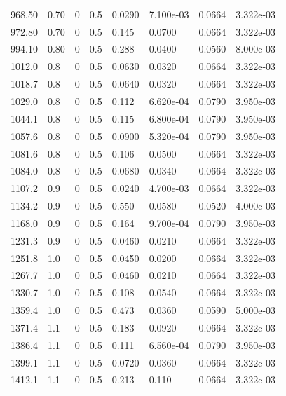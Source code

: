 \documentclass[preview]{standalone}
\begin{document}
{{{\begin{tabular}{L{1.2cm}C{1.2cm} C{0.3cm}C{0.5cm} C{1.4cm}C{1.4cm} C{1.4cm}C{1.4cm}}
  968.50  &  0.70  & 0     & 0.5 &  0.0290  & 7.100e-03  & 0.0664 &  3.322e-03   \\ 
  972.80  &  0.70  & 0     & 0.5 &  0.145  & 0.0700  & 0.0664 &  3.322e-03   \\ 
  994.10  &  0.80  & 0     & 0.5 &  0.288  & 0.0400  & 0.0560 &  8.000e-03   \\ 
  1012.0  &   0.8  & 0     & 0.5 &  0.0630  & 0.0320  & 0.0664 &  3.322e-03   \\ 
  1018.7  &   0.8  & 0     & 0.5 &  0.0640  & 0.0320  & 0.0664 &  3.322e-03   \\ 
  1029.0  &   0.8  & 0     & 0.5 &  0.112  & 6.620e-04  & 0.0790 &  3.950e-03   \\ 
  1044.1  &   0.8  & 0     & 0.5 &  0.115  & 6.800e-04  & 0.0790 &  3.950e-03   \\ 
  1057.6  &   0.8  & 0     & 0.5 &  0.0900  & 5.320e-04  & 0.0790 &  3.950e-03   \\ 
  1081.6  &   0.8  & 0     & 0.5 &  0.106  & 0.0500  & 0.0664 &  3.322e-03   \\ 
  1084.0  &   0.8  & 0     & 0.5 &  0.0680  & 0.0340  & 0.0664 &  3.322e-03   \\ 
  1107.2  &   0.9  & 0     & 0.5 &  0.0240  & 4.700e-03  & 0.0664 &  3.322e-03   \\ 
  1134.2  &   0.9  & 0     & 0.5 &  0.550  & 0.0580  & 0.0520 &  4.000e-03   \\ 
  1168.0  &   0.9  & 0     & 0.5 &  0.164  & 9.700e-04  & 0.0790 &  3.950e-03   \\ 
  1231.3  &   0.9  & 0     & 0.5 &  0.0460  & 0.0210  & 0.0664 &  3.322e-03   \\ 
  1251.8  &   1.0  & 0     & 0.5 &  0.0450  & 0.0200  & 0.0664 &  3.322e-03   \\ 
  1267.7  &   1.0  & 0     & 0.5 &  0.0460  & 0.0210  & 0.0664 &  3.322e-03   \\ 
  1330.7  &   1.0  & 0     & 0.5 &  0.108  & 0.0540  & 0.0664 &  3.322e-03   \\ 
  1359.4  &   1.0  & 0     & 0.5 &  0.473  & 0.0360  & 0.0590 &  5.000e-03   \\ 
  1371.4  &   1.1  & 0     & 0.5 &  0.183  & 0.0920  & 0.0664 &  3.322e-03   \\ 
  1386.4  &   1.1  & 0     & 0.5 &  0.111  & 6.560e-04  & 0.0790 &  3.950e-03   \\ 
  1399.1  &   1.1  & 0     & 0.5 &  0.0720  & 0.0360  & 0.0664 &  3.322e-03   \\ 
  1412.1  &   1.1  & 0     & 0.5 &  0.213  & 0.110  & 0.0664 &  3.322e-03   \\ 

\end{tabular}}}}
\end{document}
